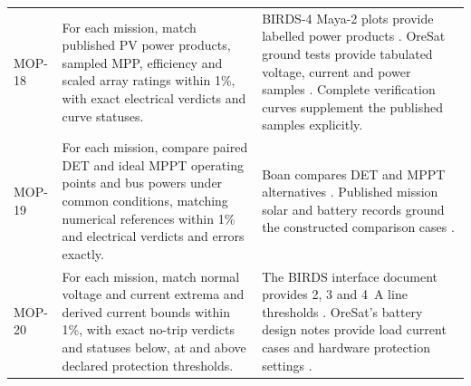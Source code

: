 \begin{longtable}{@{}P{0.13\ReportTableBodyWidth}P{0.45\ReportTableBodyWidth}P{0.42\ReportTableBodyWidth}@{}}
\addlinespace[3pt]
MOP-18 & For each mission, match published PV power products, sampled MPP, efficiency and scaled array ratings within 1\%, with exact electrical verdicts and curve statuses. & BIRDS-4 Maya-2 plots provide labelled power products \citep[Figs.~13--14]{shrestha2021birdssafety}. OreSat ground tests provide tabulated voltage, current and power samples \citep{oresatsolarsweep}. Complete verification curves supplement the published samples explicitly. \\
\addlinespace[3pt]
MOP-19 & For each mission, compare paired DET and ideal MPPT operating points and bus powers under common conditions, matching numerical references within 1\% and electrical verdicts and errors exactly. & Boan compares DET and MPPT alternatives \citep[Sec.~3]{review-0289}. Published mission solar and battery records ground the constructed comparison cases \citep{shrestha2021birdssafety,greenberg2021oresat,oresatsolarsweep}. \\
\addlinespace[3pt]
MOP-20 & For each mission, match normal voltage and current extrema and derived current bounds within 1\%, with exact no-trip verdicts and statuses below, at and above declared protection thresholds. & The BIRDS interface document provides 2, 3 and 4~A line thresholds \citep[Sec.~6.3]{kyutech2021birdsicd}. OreSat's battery design notes provide load current cases and hardware protection settings \citep{oresat2025batterydesign}. \\
\end{longtable}
\endgroup
